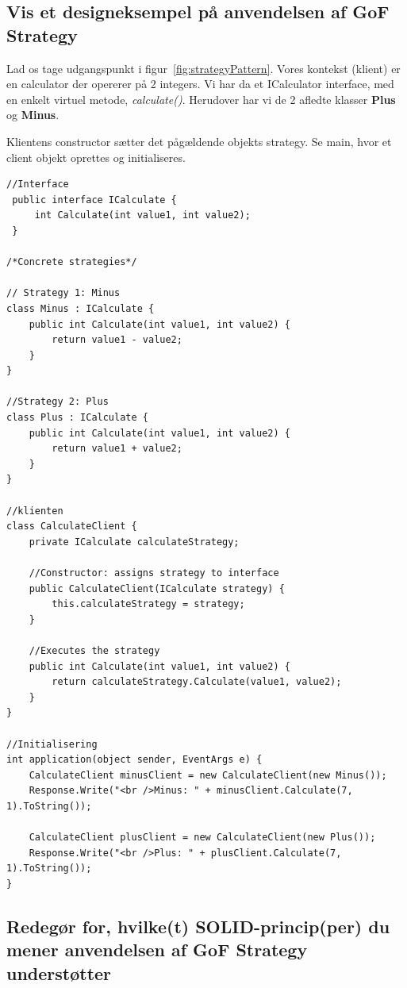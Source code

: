 \subsection{Vis et designeksempel på anvendelsen af GoF Strategy}

Lad os tage udgangspunkt i figur~\ref{fig:strategyPattern}. Vores kontekst (klient) er en calculator der opererer på 2 integers.
Vi har da et ICalculator interface, med en enkelt virtuel metode, \textit{calculate()}.
Herudover har vi de 2 afledte klasser \textbf{Plus} og \textbf{Minus}.

Klientens constructor sætter det pågældende objekts strategy. Se main, hvor et client objekt oprettes og initialiseres.

\begin{lstlisting}
//Interface
 public interface ICalculate {
	 int Calculate(int value1, int value2);
 }

/*Concrete strategies*/

// Strategy 1: Minus
class Minus : ICalculate {
	public int Calculate(int value1, int value2) {
		return value1 - value2;
	}
}

//Strategy 2: Plus
class Plus : ICalculate {
	public int Calculate(int value1, int value2) {
		return value1 + value2;
	}
}

//klienten
class CalculateClient {
	private ICalculate calculateStrategy;

	//Constructor: assigns strategy to interface
	public CalculateClient(ICalculate strategy) {
		this.calculateStrategy = strategy;
	}

	//Executes the strategy
	public int Calculate(int value1, int value2) {
		return calculateStrategy.Calculate(value1, value2);
	}
}

//Initialisering
int application(object sender, EventArgs e) {
	CalculateClient minusClient = new CalculateClient(new Minus());
	Response.Write("<br />Minus: " + minusClient.Calculate(7, 1).ToString());

	CalculateClient plusClient = new CalculateClient(new Plus());
	Response.Write("<br />Plus: " + plusClient.Calculate(7, 1).ToString());
}

\end{lstlisting}

\subsection{Redegør for, hvilke(t) SOLID-princip(per) du mener anvendelsen af GoF Strategy understøtter}

